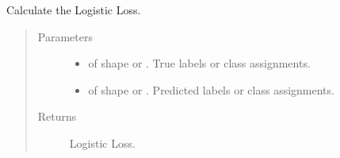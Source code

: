 \documentclass[letterpaper,10pt,english]{sphinxmanual}
\begin{document}
\begin{fulllineitems}
\label{\detokenize{pusion.evaluation.evaluation_metrics:pusion.evaluation.evaluation_metrics.log}}
\sphinxAtStartPar
Calculate the Logistic Loss.
\begin{quote}\begin{description}
\item[{Parameters}] \leavevmode\begin{itemize}
\item {} 
\sphinxAtStartPar
{} \textendash{}  of shape  or . True labels or class assignments.

\item {} 
\sphinxAtStartPar
{} \textendash{}  of shape  or . Predicted labels or
class assignments.

\end{itemize}

\item[{Returns}] \leavevmode
\sphinxAtStartPar
Logistic Loss.

\end{description}\end{quote}

\end{fulllineitems}

\end{document}
